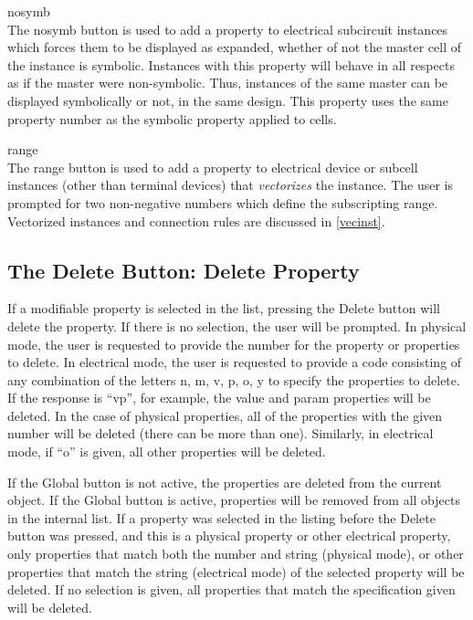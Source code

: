 \begin{description}
\item{\cb nosymb}\\
The {\cb nosymb} button is used to add a property to electrical
subcircuit instances which forces them to be displayed as expanded,
whether of not the master cell of the instance is symbolic. 
Instances with this property will behave in all respects as if the
master were non-symbolic.  Thus, instances of the same master can be
displayed symbolically or not, in the same design.  This property
uses the same property number as the {\et symbolic} property applied
to cells.

\item{\cb range}\\
The {\cb range} button is used to add a property to electrical device
or subcell instances (other than terminal devices) that {\it
vectorizes} the instance.  The user is prompted for two non-negative
numbers which define the subscripting range.  Vectorized instances and
connection rules are discussed in \ref{vecinst}.
\end{description}

\subsection{The {\cb Delete} Button: Delete Property}
If a modifiable property is selected in the list, pressing the {\cb
Delete} button will delete the property.  If there is no selection,
the user will be prompted.  In physical mode, the user is requested to
provide the number for the property or properties to delete.  In
electrical mode, the user is requested to provide a code consisting of
any combination of the letters {\vt n}, {\vt m}, {\vt v}, {\vt p},
{\vt o}, {\vt y} to specify the properties to delete.  If the response
is ``{\vt vp}'', for example, the {\et value} and {\et param}
properties will be deleted.  In the case of physical properties, all
of the properties with the given number will be deleted (there can be
more than one).  Similarly, in electrical mode, if ``{\vt o}'' is
given, all {\et other} properties will be deleted.

If the {\cb Global} button is not active, the properties are deleted
from the current object.  If the {\cb Global} button is active,
properties will be removed from all objects in the internal list.  If
a property was selected in the listing before the {\cb Delete} button
was pressed, and this is a physical property or {\et other} electrical
property, only properties that match both the number and string
(physical mode), or {\et other} properties that match the string
(electrical mode) of the selected property will be deleted.  If no
selection is given, all properties that match the specification given
will be deleted.


